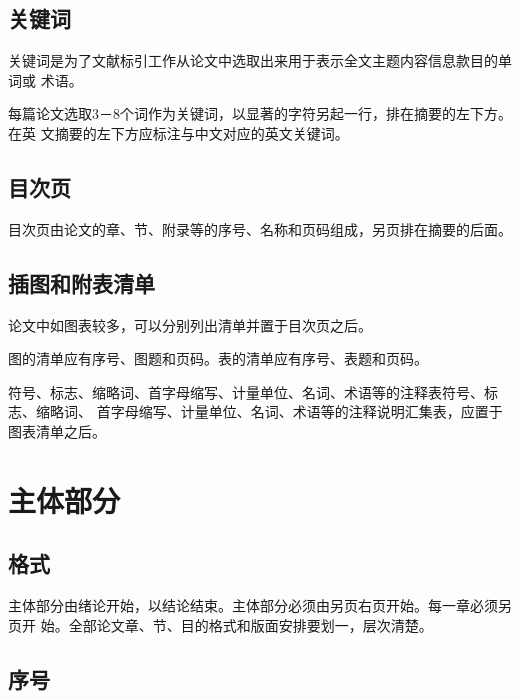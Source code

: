 \documentclass[oneside, phd]{njuthesis}
\begin{document}
\subsection{关键词}

关键词是为了文献标引工作从论文中选取出来用于表示全文主题内容信息款目的单词或
术语。

每篇论文选取3－8个词作为关键词，以显著的字符另起一行，排在摘要的左下方。在英
文摘要的左下方应标注与中文对应的英文关键词。

\subsection{目次页}

目次页由论文的章、节、附录等的序号、名称和页码组成，另页排在摘要的后面。

\subsection{插图和附表清单}

论文中如图表较多，可以分别列出清单并置于目次页之后。


图的清单应有序号、图题和页码。表的清单应有序号、表题和页码。

符号、标志、缩略词、首字母缩写、计量单位、名词、术语等的注释表符号、标志、缩略词、
首字母缩写、计量单位、名词、术语等的注释说明汇集表，应置于图表清单之后。

\section{主体部分}

\subsection{格式}

主体部分由绪论开始，以结论结束。主体部分必须由另页右页开始。每一章必须另页开
始。全部论文章、节、目的格式和版面安排要划一，层次清楚。

\subsection{序号}
\end{document}
